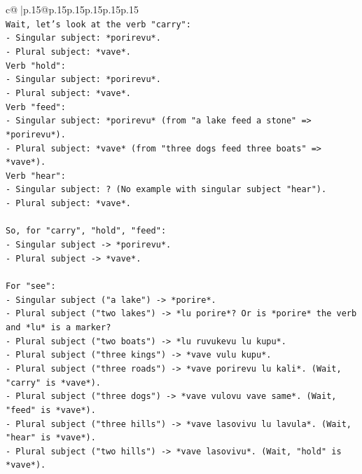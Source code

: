 \documentclass{article}
\begin{document}
{\begin{supertabular}{c@{$\;$}|p{.15\linewidth}@{}p{.15\linewidth}p{.15\linewidth}p{.15\linewidth}p{.15\linewidth}p{.15\linewidth}}
{{{\\ 
\texttt{Wait, let's look at the verb "carry":} \\
\texttt{{-} Singular subject: *porirevu*.} \\
\texttt{{-} Plural subject: *vave*.} \\
\texttt{Verb "hold":} \\
\texttt{{-} Singular subject: *porirevu*.} \\
\texttt{{-} Plural subject: *vave*.} \\
\texttt{Verb "feed":} \\
\texttt{{-} Singular subject: *porirevu* (from "a lake feed a stone" => *porirevu*).} \\
\texttt{{-} Plural subject: *vave* (from "three dogs feed three boats" => *vave*).} \\
\texttt{Verb "hear":} \\
\texttt{{-} Singular subject: ? (No example with singular subject "hear").} \\
\texttt{{-} Plural subject: *vave*.} \\
\\ 
\texttt{So, for "carry", "hold", "feed":} \\
\texttt{{-} Singular subject {-}> *porirevu*.} \\
\texttt{{-} Plural subject {-}> *vave*.} \\
\\ 
\texttt{For "see":} \\
\texttt{{-} Singular subject ("a lake") {-}> *porire*.} \\
\texttt{{-} Plural subject ("two lakes") {-}> *lu porire*? Or is *porire* the verb and *lu* is a marker?} \\
\texttt{{-} Plural subject ("two boats") {-}> *lu ruvukevu lu kupu*.} \\
\texttt{{-} Plural subject ("three kings") {-}> *vave vulu kupu*.} \\
\texttt{{-} Plural subject ("three roads") {-}> *vave porirevu lu kali*. (Wait, "carry" is *vave*).} \\
\texttt{{-} Plural subject ("three dogs") {-}> *vave vulovu vave same*. (Wait, "feed" is *vave*).} \\
\texttt{{-} Plural subject ("three hills") {-}> *vave lasovivu lu lavula*. (Wait, "hear" is *vave*).} \\
\texttt{{-} Plural subject ("two hills") {-}> *vave lasovivu*. (Wait, "hold" is *vave*).} \\
\\ 
}}}
\end{supertabular}}
\end{document}
